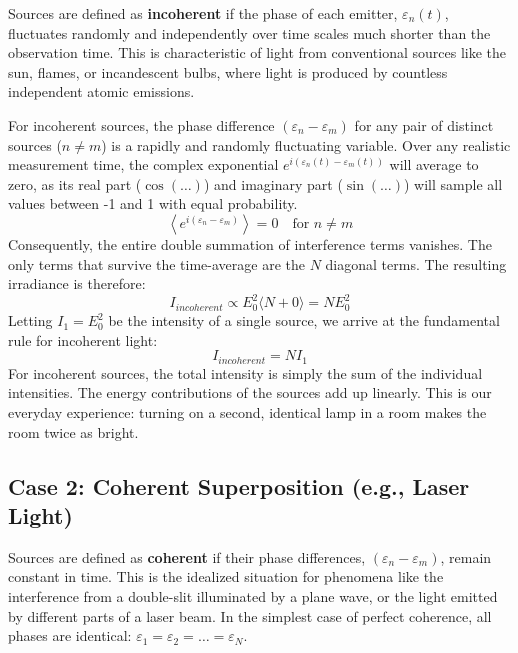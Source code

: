 \begin{definition}
\begin{definition}[Incoherence]
Sources are defined as \textbf{incoherent} if the phase of each emitter, $\varepsilon_n(t)$, fluctuates randomly and independently over time scales much shorter than the observation time. This is characteristic of light from conventional sources like the sun, flames, or incandescent bulbs, where light is produced by countless independent atomic emissions.
\end{definition}

\begin{proposition}
For incoherent sources, the phase difference $(\varepsilon_n - \varepsilon_m)$ for any pair of distinct sources ($n \neq m$) is a rapidly and randomly fluctuating variable. Over any realistic measurement time, the complex exponential $e^{i(\varepsilon_n(t) - \varepsilon_m(t))}$ will average to zero, as its real part ($\cos(\dots)$) and imaginary part ($\sin(\dots)$) will sample all values between -1 and 1 with equal probability.
$$ \left\langle e^{i(\varepsilon_n - \varepsilon_m)} \right\rangle = 0 \quad \text{for } n \neq m $$
Consequently, the entire double summation of interference terms vanishes. The only terms that survive the time-average are the $N$ diagonal terms. The resulting irradiance is therefore:
$$ I_{incoherent} \propto E_0^2 \langle N + 0 \rangle = N E_0^2 $$
Letting $I_1 = E_0^2$ be the intensity of a single source, we arrive at the fundamental rule for incoherent light:
$$ I_{incoherent} = N I_1 $$
For incoherent sources, the total intensity is simply the sum of the individual intensities. The energy contributions of the sources add up linearly. This is our everyday experience: turning on a second, identical lamp in a room makes the room twice as bright.
\end{proposition}

\subsection{Case 2: Coherent Superposition (e.g., Laser Light)}

\begin{definition}[Coherence]
Sources are defined as \textbf{coherent} if their phase differences, $(\varepsilon_n - \varepsilon_m)$, remain constant in time. This is the idealized situation for phenomena like the interference from a double-slit illuminated by a plane wave, or the light emitted by different parts of a laser beam. In the simplest case of perfect coherence, all phases are identical: $\varepsilon_1 = \varepsilon_2 = \dots = \varepsilon_N$.
\end{definition}


\end{definition}
